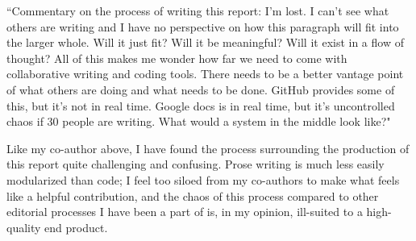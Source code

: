 ``Commentary on the process of writing this report: I'm lost. I can't see what others are writing and I have no perspective on how this paragraph will fit into the larger whole. Will it just fit? Will it be meaningful? Will it exist in a flow of thought? All of this makes me wonder how far we need to come with collaborative writing and coding tools. There needs to be a better vantage point of what others are doing and what needs to be done. GitHub provides some of this, but it's not in real time. Google docs is in real time, but it's uncontrolled chaos if 30 people are writing. What would a system in the middle look like?"

Like my co-author above, I have found the process surrounding the production of this report quite challenging and confusing. 
Prose writing is much less easily modularized than code; I feel too siloed from my co-authors to make what feels like a helpful 
contribution, and the chaos of this process compared to other editorial processes I have been a part of is, in my opinion, ill-suited 
to a high-quality end product. 
